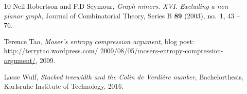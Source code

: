 \begin{thebibliography}{10}
Neil Robertson and P.D Seymour, \emph{{G}raph minors. {XVI}. {E}xcluding a
  non-planar graph}, Journal of Combinatorial Theory, Series B \textbf{89}
  (2003), no.~1, 43 -- 76.

Terence Tao, \emph{Moser's entropy compression argument}, blog post:
  \href{http://terrytao.wordpress.com/2009/08/05/mosers-entropy-compression-argument/}{http://terrytao.wordpress.com/
  2009/08/05/mosers-entropy-compression-argument/}, 2009.

Lasse Wulf, \emph{Stacked treewidth and the {C}olin de {V}erdi\'{e}re number},
  Bachelorthesis, Karlsruhe Institute of Technology, 2016.

\end{thebibliography}